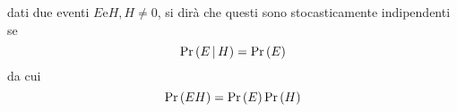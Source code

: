\documentclass{subfiles}
\begin{document}
\begin{Definition*}
    dati due eventi \(E \text{e} H, H \neq 0\), si dirà che questi sono stocasticamente indipendenti se
    \[
        \Prob{E}[H] = \Prob{E}
    \]
    da cui
    \[
        \Prob{EH} = \Prob{E} \Prob{H}
    \]
\end{Definition*}
\end{document}
